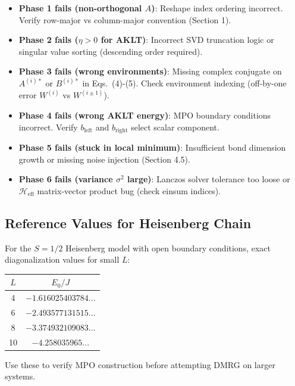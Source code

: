 \documentclass[aps,prb,onecolumn,scriptaddress]{revtex4-2}
\begin{document}
	\begin{itemize}
		\item \textbf{Phase 1 fails (non-orthogonal $A$)}: Reshape index ordering incorrect. Verify row-major vs column-major convention (Section 1).
		\item \textbf{Phase 2 fails ($\eta > 0$ for AKLT)}: Incorrect SVD truncation logic or singular value sorting (descending order required).
		\item \textbf{Phase 3 fails (wrong environments)}: Missing complex conjugate on $A^{(i)*}$ or $B^{(i)*}$ in Eqs.~(4)-(5). Check environment indexing (off-by-one error $W^{(i)}$ vs $W^{(i\pm1)}$).
		\item \textbf{Phase 4 fails (wrong AKLT energy)}: MPO boundary conditions incorrect. Verify $b_{\text{left}}$ and $b_{\text{right}}$ select scalar component.
		\item \textbf{Phase 5 fails (stuck in local minimum)}: Insufficient bond dimension growth or missing noise injection (Section 4.5).
		\item \textbf{Phase 6 fails (variance $\sigma^2$ large)}: Lanczos solver tolerance too loose or $\mathcal{H}_{\text{eff}}$ matrix-vector product bug (check einsum indices).
	\end{itemize}
	
	\subsection{Reference Values for Heisenberg Chain}
	For the $S=1/2$ Heisenberg model with open boundary conditions, exact diagonalization values for small $L$:
	\begin{center}
		\begin{tabular}{@{}cc@{}}
			\toprule
			$L$ & $E_0 / J$ \\
			\midrule
			4 & $-1.616025403784...$ \\
			6 & $-2.493577131515...$ \\
			8 & $-3.374932109083...$ \\
			10 & $-4.258035965...$ \\
			\bottomrule
		\end{tabular}
	\end{center}
	Use these to verify MPO construction before attempting DMRG on larger systems.
	
	
\end{document}
